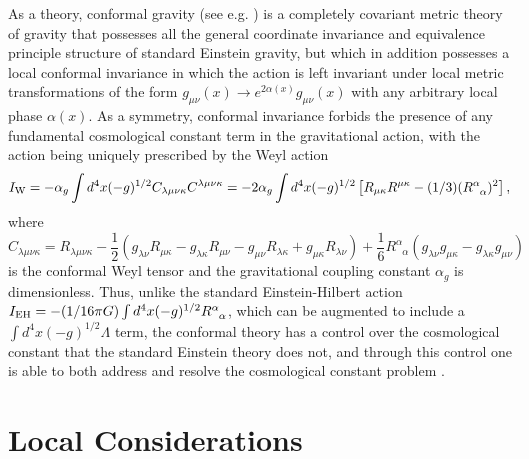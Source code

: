\documentclass[preprint,aps]{revtex4}
\begin{document}
As a theory, conformal gravity (see e.g. \cite{Mannheim2006}) is a completely covariant metric  theory of gravity that possesses all the general coordinate invariance and equivalence principle structure of standard Einstein gravity, but which in addition possesses a local conformal invariance in which the action is left invariant under local metric transformations of the form $g_{\mu\nu}(x)\rightarrow e^{2\alpha(x)}g_{\mu\nu}(x)$ with any arbitrary local phase $\alpha(x)$.  As a symmetry,  conformal invariance forbids the presence of any fundamental cosmological constant term in the gravitational action, with the action being uniquely prescribed by the Weyl action  
%
\begin{equation}
I_{\rm W}=-\alpha_g\int d^4x (-g)^{1/2}C_{\lambda\mu\nu\kappa}
C^{\lambda\mu\nu\kappa}
=-2\alpha_g\int d^4x (-g)^{1/2}\left[R_{\mu\kappa}R^{\mu\kappa}-(1/3) (R^{\alpha}_{\phantom{\alpha}\alpha})^2\right],
\label{182}
\end{equation}
% 
where 
%
\begin{equation}
C_{\lambda\mu\nu\kappa}= R_{\lambda\mu\nu\kappa}
-\frac{1}{2}\left(g_{\lambda\nu}R_{\mu\kappa}-
g_{\lambda\kappa}R_{\mu\nu}-
g_{\mu\nu}R_{\lambda\kappa}+
g_{\mu\kappa}R_{\lambda\nu}\right)
+\frac{1}{6}R^{\alpha}_{\phantom{\alpha}\alpha}\left(
g_{\lambda\nu}g_{\mu\kappa}-
g_{\lambda\kappa}g_{\mu\nu}\right)
\label{180}
\end{equation}
% 
is the conformal Weyl tensor and the gravitational coupling constant $\alpha_g$ is dimensionless. Thus, unlike the standard Einstein-Hilbert action $I_{\rm EH}=-(1/16 \pi G)\int d^4x (-g)^{1/2}R^{\alpha}_{\phantom{\alpha}\alpha}$, which can be augmented to include a $\int d^4x (-g)^{1/2}\Lambda$ term, the conformal theory has a control over the cosmological constant that the standard Einstein theory does not, and through this control one is able to both address and resolve the cosmological constant problem \cite{Mannheim2009,Mannheim2010a}.

\section{Local Considerations}
\label{s2}
\end{document}
